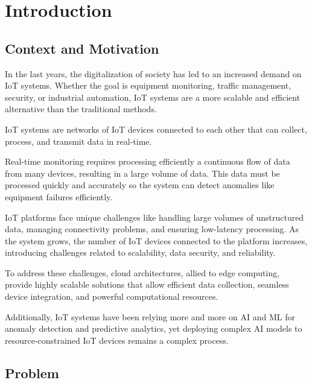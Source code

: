 
%

\chapter{Introduction}
\label{cha:introduction}

\section{Context and Motivation}
In the last years, the digitalization of society has led to an increased
demand on \gls{IoT} systems. Whether the goal is equipment monitoring, traffic
management, security, or industrial automation, \gls{IoT} systems are a more
scalable and efficient alternative than the traditional methods.

\gls{IoT} systems are networks of \gls{IoT} devices connected to each other
that can collect, process, and transmit data in real-time.

Real-time monitoring requires processing efficiently a continuous flow of data from many
devices, resulting in a large volume of data. This data must be processed
quickly and accurately so the system can detect anomalies like equipment failures
efficiently.

IoT platforms face unique challenges like handling large volumes of
unstructured data, managing connectivity problems, and ensuring low-latency
processing. As the system grows, the number of \gls{IoT} devices connected to
the platform increases, introducing challenges related to scalability, data
security, and reliability.

To address these challenges, cloud architectures, allied to edge computing, provide highly scalable solutions
that allow efficient data collection, seamless device integration, and powerful
computational resources.

Additionally, \gls{IoT} systems have been relying more and more on \gls{AI} and \gls{ML} for
anomaly detection and predictive analytics, yet deploying complex \gls{AI}
models to resource-constrained \gls{IoT} devices remains a complex process.

\section{Problem}

